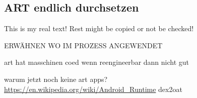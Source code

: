 \subsection{ART endlich durchsetzen} \label{subsection:external-art}
This is my real text! Rest might be copied or not be checked!

ERWÄHNEN WO IM PROZESS ANGEWENDET\newline

art hat masschinen coed\newline
wenn reengineerbar dann nicht gut

warum jetzt noch keine art apps?
\url{https://en.wikipedia.org/wiki/Android_Runtime}\newline
dex2oat\newline
